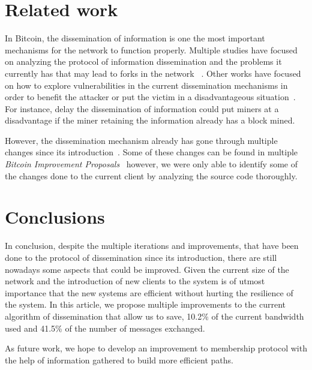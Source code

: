 \documentclass{dads}   %
\begin{document}
\section{Related work}
In Bitcoin, the dissemination of information is one the most important mechanisms for the network to function properly. Multiple studies have focused on analyzing the protocol of information dissemination and the problems it currently has that may lead to forks in the network ~\cite{decker2013information,croman2016scaling,miller2015discovering}.
Other works have focused on how to explore vulnerabilities in the current dissemination mechanisms in order to benefit the attacker or put the victim in a disadvantageous situation~\cite{apostolaki2016hijacking, sapirshtein2016optimal, eyal2014majority}. For instance, delay the dissemination of information could put miners at a disadvantage if the miner retaining the information already has a block mined.

However, the dissemination mechanism already has gone through multiple changes since its introduction~\cite{nakamoto2008bitcoin}. Some of these changes can be found in multiple \textsl{Bitcoin Improvement Proposals}~\cite{bip152,bips} however, we were only able to identify some of the changes done to the current client by analyzing the source code thoroughly. 
\vspace{-2.5mm}

\section{Conclusions}
In conclusion, despite the multiple iterations and improvements, that have been done to the protocol of dissemination since its introduction, there are still nowadays some aspects that could be improved. Given the current size of the network and the introduction of new clients to the system is of utmost importance that the new systems are efficient without hurting the resilience of the system. In this article, we propose multiple improvements to the current algorithm of dissemination that allow us to save, 10.2\% of the current bandwidth used and 41.5\% of the number of messages exchanged.

As future work, we hope to develop an improvement to membership protocol with the help of information gathered to build more efficient paths.
\vspace{-2.5mm}

%

%
%
\end{document}
